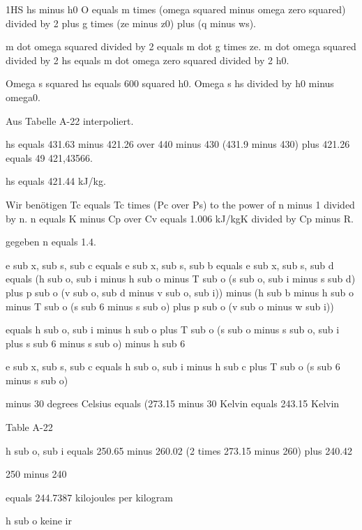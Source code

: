 1HS hs minus h0
O equals m times (omega squared minus omega zero squared) divided by 2 plus g times (ze minus z0) plus (q minus ws).

m dot omega squared divided by 2 equals m dot g times ze. m dot omega squared divided by 2 hs equals m dot omega zero squared divided by 2 h0.

Omega s squared hs equals 600 squared h0. Omega s hs divided by h0 minus omega0.

Aus Tabelle A-22 interpoliert.

hs equals 431.63 minus 421.26 over 440 minus 430 (431.9 minus 430) plus 421.26 equals 49 421,43566.

hs equals 421.44 kJ/kg.

Wir benötigen Tc equals Tc times (Pc over Ps) to the power of n minus 1 divided by n. n equals K minus Cp over Cv equals 1.006 kJ/kgK divided by Cp minus R.

gegeben n equals 1.4.

e sub x, sub s, sub c equals e sub x, sub s, sub b equals e sub x, sub s, sub d equals (h sub o, sub i minus h sub o minus T sub o (s sub o, sub i minus s sub d) plus p sub o (v sub o, sub d minus v sub o, sub i)) minus (h sub b minus h sub o minus T sub o (s sub 6 minus s sub o) plus p sub o (v sub o minus w sub i))

equals h sub o, sub i minus h sub o plus T sub o (s sub o minus s sub o, sub i plus s sub 6 minus s sub o) minus h sub 6

e sub x, sub s, sub c equals h sub o, sub i minus h sub c plus T sub o (s sub 6 minus s sub o)

minus 30 degrees Celsius equals (273.15 minus 30 Kelvin equals 243.15 Kelvin

Table A-22

h sub o, sub i equals 250.65 minus 260.02 (2 times 273.15 minus 260) plus 240.42

250 minus 240

equals 244.7387 kilojoules per kilogram

h sub o keine ir